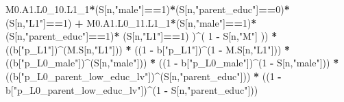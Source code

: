 \documentclass[
]{book}
\newenvironment{Shaded}{\begin{snugshade}}{\end{snugshade}}
\newcommand{\DecValTok}[1]{\textcolor[rgb]{0.00,0.00,0.81}{#1}}
\newcommand{\NormalTok}[1]{#1}
\newcommand{\SpecialCharTok}[1]{\textcolor[rgb]{0.81,0.36,0.00}{\textbf{#1}}}
\newcommand{\StringTok}[1]{\textcolor[rgb]{0.31,0.60,0.02}{#1}}
\begin{document}
\begin{Shaded}
\begin{Highlighting}[]
\NormalTok{          M0.A1.L0\_10.L1\_1}\SpecialCharTok{*}\NormalTok{(S[n,}\StringTok{"male"}\NormalTok{]}\SpecialCharTok{==}\DecValTok{1}\NormalTok{)}\SpecialCharTok{*}\NormalTok{(S[n,}\StringTok{"parent\_educ"}\NormalTok{]}\SpecialCharTok{==}\DecValTok{0}\NormalTok{)}\SpecialCharTok{*}\NormalTok{(S[n,}\StringTok{"L1"}\NormalTok{]}\SpecialCharTok{==}\DecValTok{1}\NormalTok{) }\SpecialCharTok{+}
\NormalTok{          M0.A1.L0\_11.L1\_1}\SpecialCharTok{*}\NormalTok{(S[n,}\StringTok{"male"}\NormalTok{]}\SpecialCharTok{==}\DecValTok{1}\NormalTok{)}\SpecialCharTok{*}\NormalTok{(S[n,}\StringTok{"parent\_educ"}\NormalTok{]}\SpecialCharTok{==}\DecValTok{1}\NormalTok{)}\SpecialCharTok{*}
\NormalTok{          (S[n,}\StringTok{"L1"}\NormalTok{]}\SpecialCharTok{==}\DecValTok{1}\NormalTok{) )}\SpecialCharTok{\^{}}\NormalTok{( }\DecValTok{1} \SpecialCharTok{{-}}\NormalTok{ S[n,}\StringTok{"M"}\NormalTok{] )) }\SpecialCharTok{*}
\NormalTok{      ((b[}\StringTok{"p\_L1"}\NormalTok{])}\SpecialCharTok{\^{}}\NormalTok{(M.S[n,}\StringTok{"L1"}\NormalTok{])) }\SpecialCharTok{*}
\NormalTok{      ((}\DecValTok{1} \SpecialCharTok{{-}}\NormalTok{ b[}\StringTok{"p\_L1"}\NormalTok{])}\SpecialCharTok{\^{}}\NormalTok{(}\DecValTok{1} \SpecialCharTok{{-}}\NormalTok{ M.S[n,}\StringTok{"L1"}\NormalTok{])) }\SpecialCharTok{*}
\NormalTok{      ((b[}\StringTok{"p\_L0\_male"}\NormalTok{])}\SpecialCharTok{\^{}}\NormalTok{(S[n,}\StringTok{"male"}\NormalTok{])) }\SpecialCharTok{*} 
\NormalTok{      ((}\DecValTok{1} \SpecialCharTok{{-}}\NormalTok{ b[}\StringTok{"p\_L0\_male"}\NormalTok{])}\SpecialCharTok{\^{}}\NormalTok{(}\DecValTok{1} \SpecialCharTok{{-}}\NormalTok{ S[n,}\StringTok{"male"}\NormalTok{])) }\SpecialCharTok{*} 
\NormalTok{      ((b[}\StringTok{"p\_L0\_parent\_low\_educ\_lv"}\NormalTok{])}\SpecialCharTok{\^{}}\NormalTok{(S[n,}\StringTok{"parent\_educ"}\NormalTok{])) }\SpecialCharTok{*}
\NormalTok{      ((}\DecValTok{1} \SpecialCharTok{{-}}\NormalTok{ b[}\StringTok{"p\_L0\_parent\_low\_educ\_lv"}\NormalTok{])}\SpecialCharTok{\^{}}\NormalTok{(}\DecValTok{1} \SpecialCharTok{{-}}\NormalTok{ S[n,}\StringTok{"parent\_educ"}\NormalTok{])) }
    

\end{Highlighting}
\end{Shaded}
\end{document}
